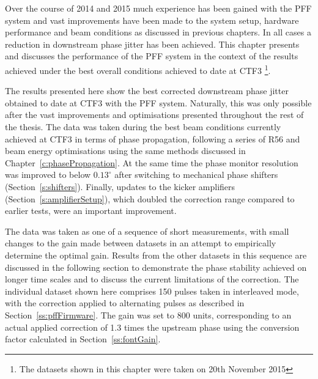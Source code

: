 
Over the course of 2014 and 2015 much experience has been gained with the PFF system and vast improvements have been made to the system setup, hardware performance and beam conditions as discussed in previous chapters. In all cases a reduction in downstream phase jitter has been achieved. This chapter presents and discusses the performance of the PFF system in the context of the results achieved under the best overall conditions achieved to date at CTF3 \footnote{The datasets shown in this chapter were taken on 20th November 2015}.




The results presented here show the best corrected downstream phase jitter obtained to date at CTF3 with the PFF system. Naturally, this was only possible after the vast improvements and optimisations presented throughout the rest of the thesis. The data was taken during the best beam conditions currently achieved at CTF3 in terms of phase propagation, following a series of R56 and beam energy optimisations using the same methods discussed in Chapter~\ref{c:phasePropagation}. %
At the same time the phase monitor resolution was improved to below \(0.13^\circ\) after switching to mechanical phase shifters (Section~\ref{s:shifters}). Finally, updates to the kicker amplifiers (Section~\ref{s:amplifierSetup}), which doubled the correction range compared to earlier tests, were an important improvement.

The data was taken as one of a sequence of short measurements, with small changes to the gain made between datasets in an attempt to empirically determine the optimal gain. Results from the other datasets in this sequence are discussed in the following section to demonstrate the phase stability achieved on longer time scales and to discuss the current limitations of the correction. The individual dataset shown here comprises 150 pulses taken in interleaved mode, with the correction applied to alternating pulses as described in Section~\ref{ss:pffFirmware}. The gain was set to 800 units, corresponding to an actual applied correction of 1.3 times the upstream phase using the conversion factor calculated in Section~\ref{ss:fontGain}.

